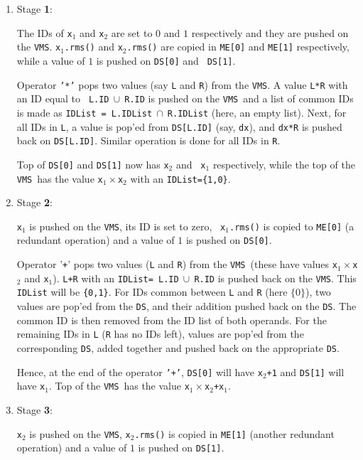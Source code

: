\documentclass[12pt]{article}
\newcommand{\DS}{{\tt DS}}
\newcommand{\VMS}{{\tt VMS}}
\begin{document}
\begin{enumerate}
\item Stage {\bf 1}:
  
  The IDs of {\tt x$_1$} and {\tt x$_2$} are set to $0$ and $1$
  respectively and they are pushed on the \VMS.  {\tt x$_1$.rms()}
  and {\tt x$_2$.rms()} are copied in {\tt ME[0]} and {\tt ME[1]}
  respectively, while a value of $1$ is pushed on {\tt DS[0]} and {\tt
  DS[1]}.
  

  Operator {\tt '*'} pops two values (say {\tt L} and {\tt R}) from
  the \VMS.  A value {\tt L*R} with an ID equal to {\tt
  L.ID}$~\cup~${\tt R.ID} is pushed on the \VMS\ and a list of common
  IDs is made as {\tt IDList = L.IDList}$~\cap~${\tt R.IDList} (here,
  an empty list).  Next, for all IDs in {\tt L}, a value is pop'ed from
  {\tt DS[L.ID]} (say, {\tt dx}), and {\tt dx*R} is pushed back on
  {\tt DS[L.ID]}.  Similar operation is done for all IDs in {\tt R}.
  
  Top of {\tt DS[0]} and {\tt DS[1]} now has {\tt x$_2$} and {\tt
  x$_1$} respectively, while the top of the \VMS\ has the value
  {\tt x$_1 \times $x$_2$} with an {\tt IDList=\{1,0\}}.

\item Stage {\bf 2}:
  
  {\tt x$_1$} is pushed on the \VMS, its ID is set to zero, {\tt
  x$_1$.rms()} is copied to {\tt ME[0]} (a redundant operation) and a
  value of $1$ is pushed on {\tt DS[0]}.
  
  Operator '{\texttt{+}}' pops two values ({\tt L} and {\tt R}) from the
  \VMS\ (these have values {\tt x$_1\times$x$_2$} and {\tt x$_1$}).
  {\tt L+R} with an {\tt IDList= L.ID}$~\cup~${\tt R.ID} is pushed
  back on the \VMS.  This {\tt IDList} will be {\tt \{0,1\}}.  For IDs
  common between {\tt L} and {\tt R} (here $\{0\}$), two values are
  pop'ed from the \DS, and their addition pushed back on the \DS.  The
  common ID is then removed from the ID list of both operands.  For
  the remaining IDs in {\tt L} ({\tt R} has no IDs left), values are
  pop'ed from the corresponding {\tt DS}, added together and pushed
  back on the appropriate {\tt DS}.
  
  Hence, at the end of the operator {\tt '+'}, {\tt DS[0]} will have
  {\tt x$_2$+1} and {\tt DS[1]} will have {\tt x$_1$}.  Top of the
  \VMS\ has the value {\tt x$_1 \times$x$_2$+x$_1$}.

\item Stage {\bf 3}:
  
  {\tt x$_2$} is pushed on the \VMS, {\tt x$_2$.rms()} is copied
  in {\tt ME[1]} (another redundant operation) and a value of $1$ is
  pushed on {\tt DS[1]}.
  

\end{enumerate}
\end{document}
